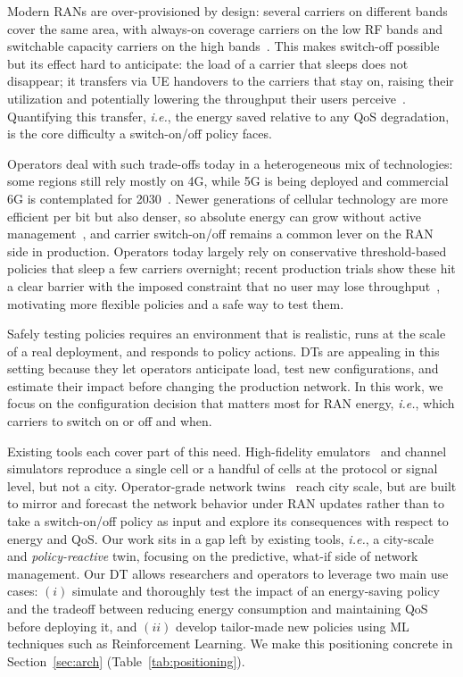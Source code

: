 \documentclass[sigconf, 10pt]{acmart}
\newcommand{\ie}{\textit{i.e.},\xspace}
\begin{document}
Modern \acp{RAN} are over-provisioned by design: several carriers on different bands cover the same area, with always-on coverage carriers on the low \ac{RF} bands and switchable capacity carriers on the high bands~\cite{survey_5g_energy_efficiency, user_transfer_5g}. 
This makes switch-off possible but its effect hard to anticipate: the load of a carrier that sleeps does not disappear; it transfers via \ac{UE} handovers to the carriers that stay on, raising their utilization and potentially lowering the throughput their users perceive~\cite{user_transfer_5g}. 
Quantifying this transfer, \ie the energy saved relative to any \ac{QoS} degradation, is the core difficulty a switch-on/off policy faces.

Operators deal with such trade-offs today in a heterogeneous mix of technologies: some regions still rely mostly on 4G, while 5G is being deployed and commercial 6G is contemplated for 2030~\cite{ericsson2025mobility}.
Newer generations of cellular technology are more efficient per bit but also denser, so absolute energy can grow without active management~\cite{gsma20205g}, and carrier switch-on/off remains a common lever on the \ac{RAN} side in production. 
Operators today largely rely on conservative threshold-based policies that sleep a few carriers overnight; recent production trials show these hit a clear barrier with the imposed constraint that no user may lose throughput~\cite{infocom_telf}, motivating more flexible policies and a safe way to test them.

Safely testing policies requires an environment that is realistic, runs at the scale of a real deployment, and responds to policy actions. 
\acfp{DT} are appealing in this setting because they let operators anticipate load, test new configurations, and estimate their impact before changing the production network. In this work, we focus on the configuration decision that matters most for \ac{RAN} energy, \ie which carriers to switch on or off and when.


Existing tools each cover part of this need.
High-fidelity emulators~\cite{ns3, colosseum} and channel simulators reproduce a single cell or a handful of cells at the protocol or signal level, but not a city. 
Operator-grade network twins~\cite{nokia_ran_dt, nvidia_aodt} reach city scale, but are built to mirror and forecast the network behavior under RAN updates rather than to take a switch-on/off policy as input and explore its consequences with respect to energy and \ac{QoS}. 
Our work sits in a gap left by existing tools, \ie a city-scale and \textit{policy-reactive} twin, focusing on the predictive, what-if side of network management. 
Our \ac{DT} allows researchers and operators to leverage two main use cases: $(i)$ simulate and thoroughly test the impact of an energy-saving policy and the tradeoff between reducing energy consumption and maintaining \ac{QoS} before deploying it, and $(ii)$ develop tailor-made new policies using \ac{ML} techniques such as Reinforcement Learning. 
We make this positioning concrete in Section~\ref{sec:arch} (Table~\ref{tab:positioning}).
\end{document}
